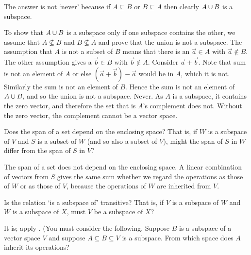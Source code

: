 \begin{exercises}
\begin{answer}
\begin{exparts}
          The answer is not `never' because if \( A\subseteq B \) or
          \( B\subseteq A \) then clearly \( A\cup B \) is a subspace.

          To show that \( A\cup B \) is a subspace only if one
          subspace contains the other, we assume that \( A\not\subseteq B \)
          and \( B\not\subseteq A \) and prove that 
          the union is not a subspace.
          The assumption that \( A \) is not a subset of \( B \) means that 
          there is an \( \vec{a}\in A \) with \( \vec{a}\not\in B \).
          The other assumption gives a \( \vec{b}\in B \) with
          \( \vec{b}\not\in A \).
          Consider \( \vec{a}+\vec{b} \).
          Note that sum is not an element of \( A \) or else
          \( (\vec{a}+\vec{b})-\vec{a} \) would be in \( A \), which it is not.
          Similarly the sum is not an element of \( B \).
          Hence the sum is not an element of \( A\cup B \), and so the union
          is not a subspace.
        \partsitem Never.
          As \( A \) is a subspace, it contains the zero vector, and therefore
          the set that is $A$'s complement does not.
          Without the zero vector, the complement cannot be a vector space.
      \end{exparts}  
    \end{answer}
  \recommended \item 
    Does the span of a set depend on the enclosing space?
    That is, if \( W \) is a subspace of \( V \) and \( S \) is a subset of
    \( W \) (and so also a subset of \( V \)), might the span of \( S \) in
    \( W \) differ from the span of \( S \) in \( V \)?
    \begin{answer}
      The span of a set does not depend on the enclosing space.
      A linear combination of vectors from \( S \) gives the same sum
      whether we regard the operations as those of \( W \) or as those of
      \( V \), because the operations of \( W \) are inherited from \(  V \).  
    \end{answer}
  \item 
    Is the relation `is a subspace of' transitive?
    That is, if $V$ is a subspace of $W$ and $W$ is a subspace of
    $X$, must $V$ be a subspace of $X$? 
    \begin{answer}
      It is;
      apply .
      (You must consider the following.
      Suppose \( B \) is a subspace of a vector space \( V \) and suppose
      \( A\subseteq B\subseteq V \) is a subspace.
      From which space does \( A \) inherit its operations?

\end{answer}
\end{exercises}
